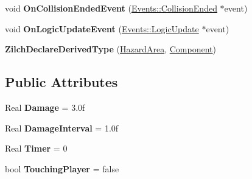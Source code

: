 \begin{DoxyCompactItemize}
\item 
\hypertarget{classDCEngine_1_1Components_1_1HazardArea_a3e0da846255e198c27e2afa5d96fca65}{void {\bfseries On\-Collision\-Ended\-Event} (\hyperlink{classDCEngine_1_1Events_1_1CollisionEnded}{Events\-::\-Collision\-Ended} $\ast$event)}\label{classDCEngine_1_1Components_1_1HazardArea_a3e0da846255e198c27e2afa5d96fca65}

\item 
\hypertarget{classDCEngine_1_1Components_1_1HazardArea_aa882052d1bb65dde4b44c24b18e163d0}{void {\bfseries On\-Logic\-Update\-Event} (\hyperlink{classDCEngine_1_1Events_1_1LogicUpdate}{Events\-::\-Logic\-Update} $\ast$event)}\label{classDCEngine_1_1Components_1_1HazardArea_aa882052d1bb65dde4b44c24b18e163d0}

\item 
\hypertarget{classDCEngine_1_1Components_1_1HazardArea_a8fff97cab77fb61bda015ff17a9e2006}{{\bfseries Zilch\-Declare\-Derived\-Type} (\hyperlink{classDCEngine_1_1Components_1_1HazardArea}{Hazard\-Area}, \hyperlink{classDCEngine_1_1Component}{Component})}\label{classDCEngine_1_1Components_1_1HazardArea_a8fff97cab77fb61bda015ff17a9e2006}

\end{DoxyCompactItemize}
\subsection*{Public Attributes}
\begin{DoxyCompactItemize}
\item 
\hypertarget{classDCEngine_1_1Components_1_1HazardArea_ae2a6a8d586d75e6d75f3c0e06627e326}{Real {\bfseries Damage} = 3.\-0f}\label{classDCEngine_1_1Components_1_1HazardArea_ae2a6a8d586d75e6d75f3c0e06627e326}

\item 
\hypertarget{classDCEngine_1_1Components_1_1HazardArea_ac22ca879af92d5237bc9211766e24eaa}{Real {\bfseries Damage\-Interval} = 1.\-0f}\label{classDCEngine_1_1Components_1_1HazardArea_ac22ca879af92d5237bc9211766e24eaa}

\item 
\hypertarget{classDCEngine_1_1Components_1_1HazardArea_a49ffa5e89df4e8f10f7e5c9a18bf61f8}{Real {\bfseries Timer} = 0}\label{classDCEngine_1_1Components_1_1HazardArea_a49ffa5e89df4e8f10f7e5c9a18bf61f8}

\item 
\hypertarget{classDCEngine_1_1Components_1_1HazardArea_a566aa2504a75fdcccd4cd6ef579a6dca}{bool {\bfseries Touching\-Player} = false}\label{classDCEngine_1_1Components_1_1HazardArea_a566aa2504a75fdcccd4cd6ef579a6dca}

\end{DoxyCompactItemize}
